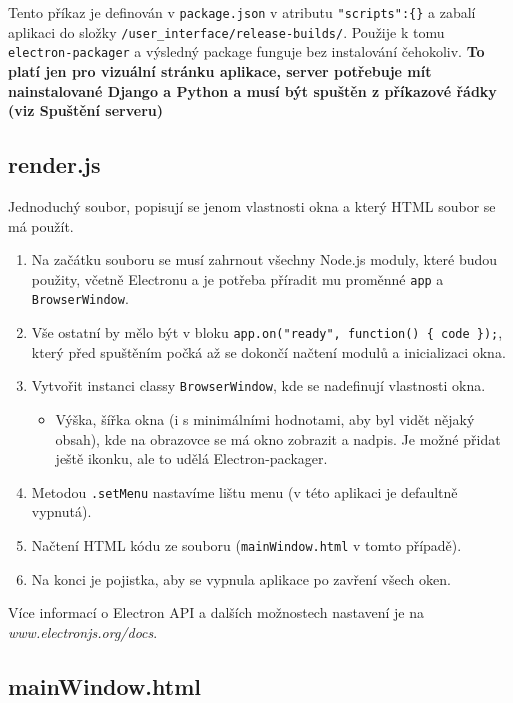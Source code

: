 \documentclass[11pt]{article}
\providecommand{\tightlist}{\setlength{\itemsep}{1pt}\setlength{\parskip}{1pt}}
\let\oldtexttt\texttt
\renewcommand{\texttt}[1]{\oldtexttt{\textcolor{codehighlight}{#1}}}
\begin{document}
Tento příkaz je definován v \texttt{package.json} v atributu
\texttt{"scripts":\{\}} a zabalí aplikaci do složky
\texttt{/user\_interface/release-builds/}. Použije k tomu
\texttt{electron-packager} a výsledný package funguje bez instalování
čehokoliv. \textbf{To platí jen pro vizuální stránku aplikace, server
potřebuje mít nainstalované Django a Python a musí být spuštěn z
příkazové řádky (viz Spuštění serveru)}

\hypertarget{render.js}{%
\subsection{render.js}\label{render.js}}

Jednoduchý soubor, popisují se jenom vlastnosti okna a který HTML soubor
se má použít.

\begin{enumerate}
\def\labelenumi{\arabic{enumi}.}
\tightlist
\item
  Na začátku souboru se musí zahrnout všechny Node.js moduly, které
  budou použity, včetně Electronu a je potřeba příradit mu proměnné
  \texttt{app} a \texttt{BrowserWindow}.
\item
  Vše ostatní by mělo být v bloku
  \texttt{app.on("ready",\ function()\ \{\ code\ \});}, který před
  spuštěním počká až se dokončí načtení modulů a inicializaci okna.
\item
  Vytvořit instanci classy \texttt{BrowserWindow}, kde se nadefinují
  vlastnosti okna.

  \begin{itemize}
  \tightlist
  \item
    Výška, šířka okna (i s minimálními hodnotami, aby byl vidět nějaký
    obsah), kde na obrazovce se má okno zobrazit a nadpis. Je možné
    přidat ještě ikonku, ale to udělá Electron-packager.
  \end{itemize}
\item
  Metodou \texttt{.setMenu} nastavíme lištu menu (v této aplikaci je
  defaultně vypnutá).
\item
  Načtení HTML kódu ze souboru (\texttt{mainWindow.html} v tomto
  případě).
\item
  Na konci je pojistka, aby se vypnula aplikace po zavření všech oken.
\end{enumerate}

Více informací o Electron API a dalších možnostech nastavení je na
\emph{www.electronjs.org/docs}.

\hypertarget{mainwindow.html}{%
\subsection{mainWindow.html}\label{mainwindow.html}}
\end{document}
